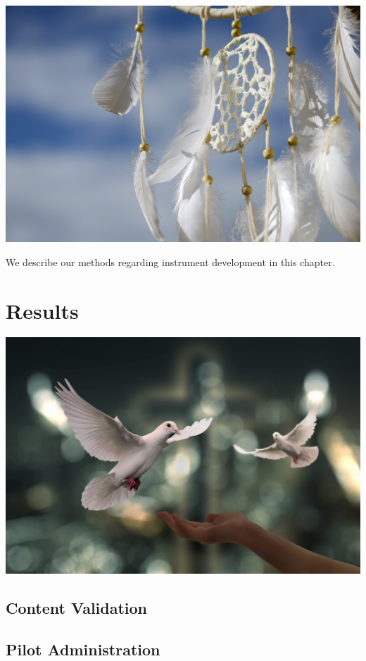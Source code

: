 \documentclass[
]{book}
\begin{document}
\includegraphics{dream-catcher-g6ec41bb43_1920.jpg}

We describe our methods regarding instrument development in this chapter.

\hypertarget{results}{%
\chapter{Results}\label{results}}

\includegraphics{doves-g750d44923_1920.jpg}

\hypertarget{content-validation}{%
\section{Content Validation}\label{content-validation}}

\hypertarget{pilot-administration}{%
\section{Pilot Administration}\label{pilot-administration}}
\end{document}
